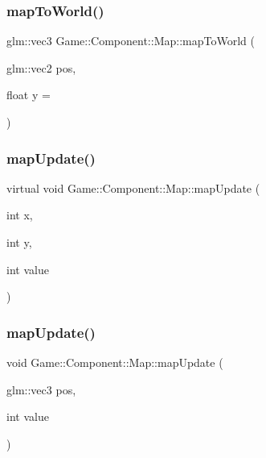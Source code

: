 \subsubsection{\texorpdfstring{map\+To\+World()}{mapToWorld()}}
{\footnotesize\ttfamily glm\+::vec3 Game\+::\+Component\+::\+Map\+::map\+To\+World (\begin{DoxyParamCaption}\item[{glm\+::vec2}]{pos,  }\item[{float}]{y = {} }\end{DoxyParamCaption})}

\mbox{\label{class_game_1_1_component_1_1_map_ae1900809e3369230a8dd3678a397ba98}} 
\subsubsection{\texorpdfstring{map\+Update()}{mapUpdate()}\hspace{0.1cm}{\footnotesize\ttfamily [1/2]}}
{\footnotesize\ttfamily virtual void Game\+::\+Component\+::\+Map\+::map\+Update (\begin{DoxyParamCaption}\item[{int}]{x,  }\item[{int}]{y,  }\item[{int}]{value }\end{DoxyParamCaption})\hspace{0.3cm}{\ttfamily [virtual]}}

\mbox{\label{class_game_1_1_component_1_1_map_aa62669035c53c17e1a7b680d28514575}} 
\subsubsection{\texorpdfstring{map\+Update()}{mapUpdate()}\hspace{0.1cm}{\footnotesize\ttfamily [2/2]}}
{\footnotesize\ttfamily void Game\+::\+Component\+::\+Map\+::map\+Update (\begin{DoxyParamCaption}\item[{glm\+::vec3}]{pos,  }\item[{int}]{value }\end{DoxyParamCaption})}


